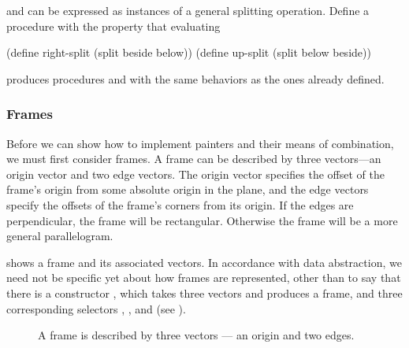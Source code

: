 \begin{exercise}
	\label{Exercise 2.45}
	 and  can be expressed as instances of a general splitting operation.
	Define a procedure  with the property that evaluating
	\begin{scheme}
	  (define right-split (split beside below))
	  (define up-split (split below beside))
	\end{scheme}
	produces procedures  and  with the same behaviors as the ones already defined.
\end{exercise}



\subsubsection*{Frames}

Before we can show how to implement painters and their means of combination, we must first consider frames.
A frame can be described by three vectors---an origin vector and two edge vectors.
The origin vector specifies the offset of the frame’s origin from some absolute origin in the plane, and the edge vectors specify the offsets of the frame’s corners from its origin.
If the edges are perpendicular, the frame will be rectangular.
Otherwise the frame will be a more general parallelogram.

 shows a frame and its associated vectors.
In accordance with data abstraction, we need not be specific yet about how frames are represented, other than to say that there is a constructor , which takes three vectors and produces a frame, and three corresponding selectors , , and  (see ).

\begin{figure}[tb]
	\centering
	
	\caption{
		A frame is described by three vectors --- an origin and two edges.
	}
	\label{Figure 2.15}
\end{figure}

